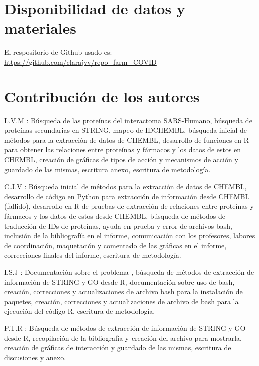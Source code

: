 \documentclass{bmcart}
\begin{document}
	\begin{backmatter}
	
		\section*{Disponibilidad de datos y materiales}
			El respositorio de Github usado es: \url{https://github.com/clarajvv/repo\_farm\_COVID}
		
		\section*{Contribución de los autores}
    		L.V.M : Búsqueda de las proteínas del interactoma SARS-Humano, búsqueda de proteínas secundarias en STRING, mapeo de IDCHEMBL, búsqueda inicial de métodos para la extracción de datos de CHEMBL, desarrollo de funciones en R para obtener las relaciones entre proteínas y fármacos y los datos de estos en CHEMBL, creación de gráficas de tipos de acción y mecanismos de acción y guardado de las mismas, escritura anexo, escritura de metodología.
    		
    		C.J.V : Búsqueda inicial de métodos para la extracción de datos de CHEMBL, desarrollo de código en Python para extracción de información desde CHEMBL (fallido), desarrollo en R de pruebas de extracción de relaciones entre proteínas y fármacos y los datos de estos desde CHEMBL, búsqueda de métodos de traducción de IDs de proteínas, ayuda en prueba y error de archivos bash, inclusión de la bibliografía en el informe, comunicación con los profesores, labores de coordinación, maquetación y comentado de las gráficas en el informe,  correcciones finales del informe, escritura de metodología.
    		
    		I.S.J : Documentación sobre el problema \cite{Gysi2020}, búsqueda de métodos de extracción de información de STRING y GO desde R, documentación sobre uso de bash, creación, correcciones y actualizaciones de archivo bash para la instalación de paquetes, creación, correcciones y actualizaciones de archivo de bash para la ejecución del código R, escritura de metodología.
    		
    		P.T.R : Búsqueda de métodos de extracción de información de STRING y GO desde R, recopilación de la bibliografía y creación del archivo para mostrarla, creación de gráficas de interacción y guardado de las mismas, escritura de discusiones y anexo.
    		
		
		
	
	\end{backmatter}
\end{document}

